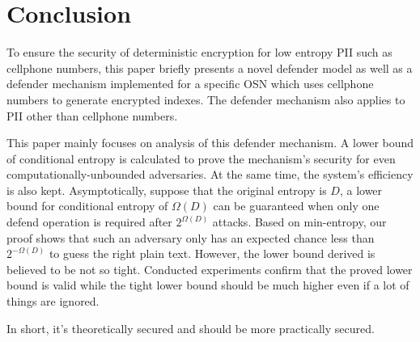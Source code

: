 \documentclass[10pt, conference, compsocconf]{IEEEtran}
\begin{document}
\section{Conclusion}
	To ensure the security of deterministic encryption
	for low entropy PII such as cellphone numbers,
	this paper briefly presents a novel defender model as well
	as a defender mechanism implemented for a specific
	OSN which uses cellphone numbers to generate encrypted indexes. 
	The defender mechanism also applies to PII other than
	cellphone numbers.
	
	This paper mainly focuses on analysis of this defender mechanism.
	A lower bound of conditional entropy is calculated to
	prove the mechanism's security for even
	computationally-unbounded adversaries.
	At the same time, the system's efficiency is also kept.
	Asymptotically, suppose that the original entropy is $D$,
	a lower bound for conditional entropy of $\Omega(D)$ can be
	guaranteed when only one defend operation is required after
	$2^{\Omega(D)}$ attacks.
	Based on min-entropy, our proof shows that
	such an adversary only has an expected chance 
	less than $2^{-\Omega(D)}$ to guess the right plain text.
	However, the lower bound derived
	is believed to be not so tight. 
	Conducted experiments confirm that the proved lower bound is valid while
	the tight lower bound
	should be much higher even if a lot of things are ignored.
	
	In short, it's theoretically secured and should be more practically secured.	
	


%
%




%
%
%
\end{document}
